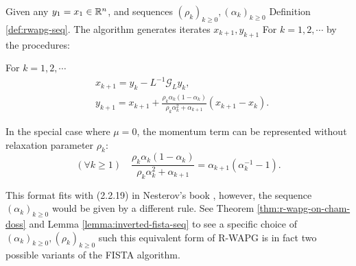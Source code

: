 \documentclass[12pt]{article}
\begin{document}
        \begin{definition}\label{def:r-wapg-momentum-form}
            Given any $y_1 = x_1 \in \mathbb R^n$, and sequences $(\rho_k)_{k \ge 0}, (\alpha_k)_{k\ge 0}$ Definition \ref{def:rwapg-seq}. 
            The algorithm generates iterates $x_{k + 1}, y_{k + 1}$ For $k = 1, 2, \cdots $ by the procedures: 
            \begin{tcolorbox}
                For $k=1, 2,\cdots $
                \begin{align*}
                    & x_{k + 1} = y_k - L^{-1}\mathcal G_Ly_k, 
                    \\
                    & 
                    y_{k + 1} = 
                    x_{k + 1} + 
                    \frac{\rho_k\alpha_k(1 - \alpha_k)}{\rho_k\alpha_k^2 + \alpha_{k + 1}}(x_{k + 1} - x_k). 
                \end{align*}    
            \end{tcolorbox}
            In the special case where $\mu = 0$, the momentum term can be represented without relaxation parameter $\rho_k$: 
            $$
                (\forall k \ge 1)\quad \frac{\rho_k\alpha_k(1 - \alpha_k)}{\rho_k\alpha_k^2 + \alpha_{k + 1}} 
                = \alpha_{k + 1}(\alpha_k^{-1} - 1).  
            $$
        \end{definition}
        \begin{remark}
            This format fits with (2.2.19) in Nesterov's book \cite{nesterov_lectures_2018}, however, the sequence $(\alpha_k)_{k \ge 0}$ would be given by a different rule. 
            See Theorem \ref{thm:r-wapg-on-cham-doss} and Lemma \ref{lemma:inverted-fista-seq} to see a specific choice of $(\alpha_k)_{k \ge0}, (\rho_k)_{ k\ge 0}$ such this equivalent form of R-WAPG is in fact two possible variants of the FISTA algorithm.
        \end{remark}
\end{document}
